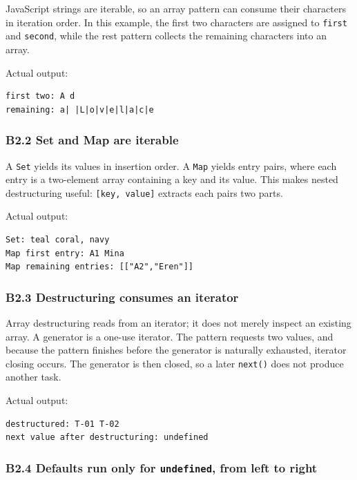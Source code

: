 \documentclass[
]{article}
\newcommand{\passthrough}[1]{#1}
\begin{document}
JavaScript strings are iterable, so an array pattern can consume their
characters in iteration order. In this example, the first two characters
are assigned to \passthrough{\lstinline!first!} and
\passthrough{\lstinline!second!}, while the rest pattern collects the
remaining characters into an array.

Actual output:

\begin{lstlisting}
first two: A d
remaining: a| |L|o|v|e|l|a|c|e
\end{lstlisting}

\subsubsection{B2.2 Set and Map are
iterable}\label{b22-set-and-map-are-iterable}

A \passthrough{\lstinline!Set!} yields its values in insertion order. A
\passthrough{\lstinline!Map!} yields entry pairs, where each entry is a
two-element array containing a key and its value. This makes nested
destructuring useful: \passthrough{\lstinline![key, value]!} extracts
each pair\textquotesingle s two parts.

Actual output:

\begin{lstlisting}
Set: teal coral, navy
Map first entry: A1 Mina
Map remaining entries: [["A2","Eren"]]
\end{lstlisting}

\subsubsection{B2.3 Destructuring consumes an
iterator}\label{b23-destructuring-consumes-an-iterator}

Array destructuring reads from an iterator; it does not merely inspect
an existing array. A generator is a one-use iterator. The pattern
requests two values, and because the pattern finishes before the
generator is naturally exhausted, iterator closing occurs. The generator
is then closed, so a later \passthrough{\lstinline!next()!} does not
produce another task.

Actual output:

\begin{lstlisting}
destructured: T-01 T-02
next value after destructuring: undefined
\end{lstlisting}

\subsubsection{\texorpdfstring{B2.4 Defaults run only for
\texttt{undefined}, from left to
right}{B2.4 Defaults run only for undefined, from left to right}}\label{b24-defaults-run-only-for-undefined-from-left-to-right}
\end{document}
